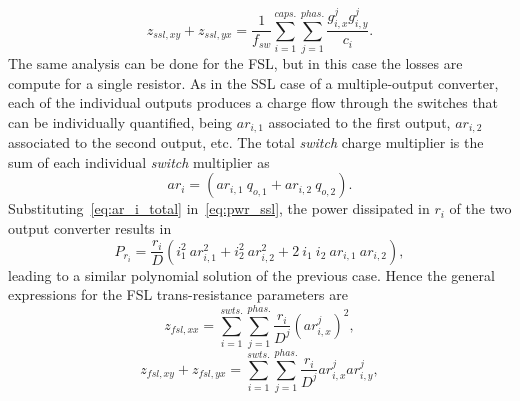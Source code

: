 \begin{equation}
  z_{ssl,xy} + z_{ssl,yx} =  \frac{1}{f_{sw}} \sum_{i=1}^{caps.} \sum_{j=1}^{phas.}
  \frac{g_{i,x}^j g_{i,y}^j}{c_i}.
 \label{eq:z_ssl_xy}
\end{equation}
The same analysis can be done for the FSL, but in this case the losses are compute for a single resistor.
As in the SSL case of a multiple-output converter, each of the individual outputs produces a charge flow through the switches that can be individually quantified, being $ar_{i,1}$ associated to the first output, $ar_{i,2}$ associated to the second output, etc. The total \emph{switch} charge multiplier is the sum of each individual \emph{switch} multiplier as
\begin{equation}
 ar_i =  (ar_{i,1} ~ q_{o,1} +  ar_{i,2} ~ q_{o,2}).
 \label{eq:ar_i_total}
\end{equation}
Substituting~\eqref{eq:ar_i_total} in~\eqref{eq:pwr_ssl}, the power dissipated in $r_i$ of the two output converter results in
\begin{equation}
 P_{r_{i}} =  \frac{r_i}{D} (i_1^2 ~ar_{i,1}^2  +  i_2^2 ~ ar_{i,2}^2 + 2 ~ i_{1} ~ i_{2} ~ ar_{i,1}~ar_{i,2}),
 \label{eq:ploss_r_1}
\end{equation}
leading to a similar polynomial solution of the previous case. Hence the general expressions for the FSL trans-resistance parameters are 
\begin{equation}
  z_{fsl,xx} =   \sum_{i=1}^{swts.} \sum_{j=1}^{phas.}
  \frac{r_{i}}{D^j} \left ( ar_{i,x}^j \right )^2,
 \label{eq:z_fsl_xx}
\end{equation}
\begin{equation}
  z_{fsl,xy} + z_{fsl,yx} =   \sum_{i=1}^{swts.} \sum_{j=1}^{phas.}
  \frac{r_{i}}{D^j} ar_{i,x}^j ar_{i,y}^j,
 \label{eq:z_fsl_xy}
\end{equation}

